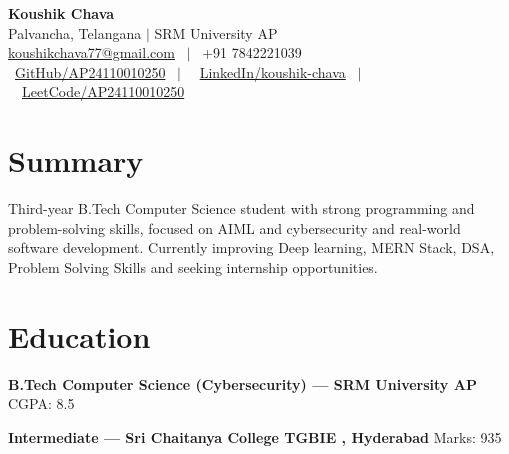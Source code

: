 \documentclass[a4paper,10.5pt]{article}
\begin{document}
\pagestyle{empty}


\begin{center}

{\fontsize{25}{28}\selectfont \textbf{\color{primary} Koushik Chava}} \\[5pt]

{\large
Palvancha, Telangana $|$ SRM University AP
} \\[3.5pt]

\href{mailto:koushikchava77@gmail.com}{koushikchava77@gmail.com}
\ $|$ \
+91 7842221039 \\[3.5pt]

\faGithub\
\href{https://github.com/AP24110010250}{GitHub/AP24110010250}
\ $|$ \
\faLinkedin\
\href{https://www.linkedin.com/in/koushik-chava}{LinkedIn/koushik-chava}
\ $|$ \
\faCode\
\href{https://leetcode.com/u/AP24110010250/}{LeetCode/AP24110010250}

\end{center}

\vspace{-4pt}


\section{Summary}

Third-year B.Tech Computer Science student with strong programming and problem-solving skills, focused on AIML and cybersecurity and real-world software development. Currently improving Deep learning, MERN Stack, DSA, Problem Solving Skills and seeking internship opportunities.


\section{Education}

\noindent
\textbf{B.Tech Computer Science (Cybersecurity) — SRM University AP}
\hfill
CGPA: 8.5

\vspace{2.5pt}

\noindent
\textbf{Intermediate — Sri Chaitanya College TGBIE , Hyderabad}
\hfill
Marks: 935
\end{document}
